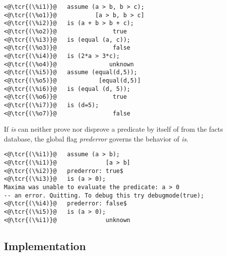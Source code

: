 \documentclass[../Maxima_Workbook.tex]{subfiles}
\begin{document}
\lz \begin{lstlisting}
<@\tcr{(\%i1)}@   assume (a > b, b > c);
<@\tcr{(\%o1)}@			  [a > b, b > c]
<@\tcr{(\%i2)}@   is (a + b > b + c);
<@\tcr{(\%o2)}@			       true
<@\tcr{(\%i3)}@   is (equal (a, c));
<@\tcr{(\%o3)}@			       false
<@\tcr{(\%i4)}@   is (2*a > 3*c);
<@\tcr{(\%o4)}@			      unknown
<@\tcr{(\%i5)}@   assume (equal(d,5));
<@\tcr{(\%o5)}@			   [equal(d,5)]
<@\tcr{(\%i6)}@   is (equal (d, 5));
<@\tcr{(\%o6)}@			       true
<@\tcr{(\%i7)}@   is (d=5);
<@\tcr{(\%o7)}@			       false
\end{lstlisting}

\lz If \emph{is} can neither prove nor disprove a predicate by itself of from the facts database, the global flag \emph{prederror} governs the behavior of \emph{is}.

\lz \begin{lstlisting}
<@\tcr{(\%i1)}@   assume (a > b);
<@\tcr{(\%i1)}@			     [a > b]
<@\tcr{(\%i2)}@   prederror: true$
<@\tcr{(\%i3)}@   is (a > 0);
Maxima was unable to evaluate the predicate: a > 0
-- an error. Quitting. To debug this try debugmode(true);
<@\tcr{(\%i4)}@   prederror: false$
<@\tcr{(\%i5)}@   is (a > 0);
<@\tcr{(\%i1)}@			     unknown
\end{lstlisting}

\subsection{Implementation}
\end{document}
